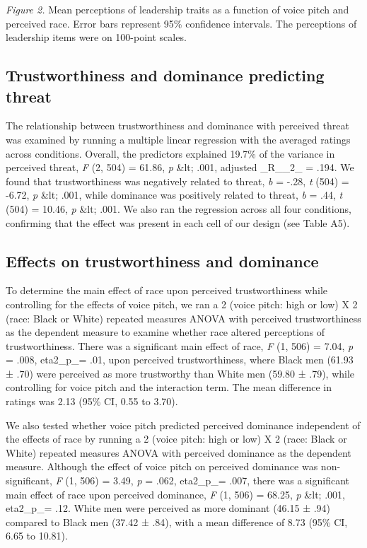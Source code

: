 \documentclass[
  english,
  man]{apa6}
\begin{document}
\emph{Figure 2.} Mean perceptions of leadership traits as a function of voice pitch and perceived race. Error bars represent 95\% confidence intervals. The perceptions of leadership items were on 100-point scales.

\hypertarget{trustworthiness-and-dominance-predicting-threat}{%
\subsection{Trustworthiness and dominance predicting threat}\label{trustworthiness-and-dominance-predicting-threat}}

The relationship between trustworthiness and dominance with perceived threat was examined by running a multiple linear regression with the averaged ratings across conditions. Overall, the predictors explained 19.7\% of the variance in perceived threat, \emph{F} (2, 504) = 61.86, \emph{p} \&lt; .001, adjusted \_R\_\_2\_ = .194. We found that trustworthiness was negatively related to threat, \emph{b} = -.28, \emph{t} (504) = -6.72, \emph{p} \&lt; .001, while dominance was positively related to threat, \emph{b} = .44, \emph{t} (504) = 10.46, \emph{p} \&lt; .001. We also ran the regression across all four conditions, confirming that the effect was present in each cell of our design (see Table A5).

\hypertarget{effects-on-trustworthiness-and-dominance}{%
\subsection{Effects on trustworthiness and dominance}\label{effects-on-trustworthiness-and-dominance}}

To determine the main effect of race upon perceived trustworthiness while controlling for the effects of voice pitch, we ran a 2 (voice pitch: high or low) X 2 (race: Black or White) repeated measures ANOVA with perceived trustworthiness as the dependent measure to examine whether race altered perceptions of trustworthiness. There was a significant main effect of race, \emph{F} (1, 506) = 7.04, \emph{p} = .008, eta2\_p\_= .01, upon perceived trustworthiness, where Black men (61.93 ± .70) were perceived as more trustworthy than White men (59.80 ± .79), while controlling for voice pitch and the interaction term. The mean difference in ratings was 2.13 (95\% CI, 0.55 to 3.70).

We also tested whether voice pitch predicted perceived dominance independent of the effects of race by running a 2 (voice pitch: high or low) X 2 (race: Black or White) repeated measures ANOVA with perceived dominance as the dependent measure. Although the effect of voice pitch on perceived dominance was non-significant, \emph{F} (1, 506) = 3.49, \emph{p} = .062, eta2\_p\_= .007, there was a significant main effect of race upon perceived dominance, \emph{F} (1, 506) = 68.25, \emph{p} \&lt; .001, eta2\_p\_= .12. White men were perceived as more dominant (46.15 ± .94) compared to Black men (37.42 ± .84), with a mean difference of 8.73 (95\% CI, 6.65 to 10.81).
\end{document}

